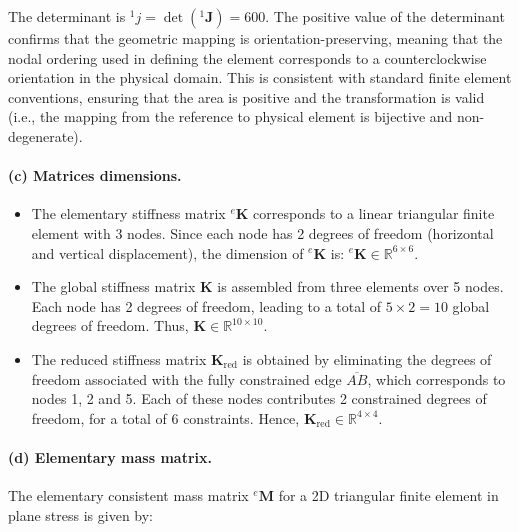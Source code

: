 \documentclass[12pt]{article}
\begin{document}
The determinant is ${}^1{j}=\det({}^1\mathbf{J}) = 600$. The positive value of the determinant confirms that the geometric mapping is orientation-preserving, meaning that the nodal ordering used in defining the element corresponds to a counterclockwise orientation in the physical domain. This is consistent with standard finite element conventions, ensuring that the area is positive and the transformation is valid (i.e., the mapping from the reference to physical element is bijective and non-degenerate).

\paragraph*{(c) Matrices dimensions.}
\begin{itemize}
	\item[(i)] The elementary stiffness matrix ${}^e \mathbf{K}$ corresponds to a linear triangular finite element with 3 nodes. Since each node has 2 degrees of freedom (horizontal and vertical displacement), the dimension of ${}^e \mathbf{K}$ is: ${}^e \mathbf{K} \in \mathbb{R}^{6 \times 6}$.

	\item[(ii)] The global stiffness matrix \( \mathbf{K} \) is assembled from three elements over 5 nodes. Each node has 2 degrees of freedom, leading to a total of \( 5 \times 2 = 10 \) global degrees of freedom. Thus, $\mathbf{K} \in \mathbb{R}^{10 \times 10}$.

	\item[(iii)] The reduced stiffness matrix \( \mathbf{K}_{\text{red}} \) is obtained by eliminating the degrees of freedom associated with the fully constrained edge \( \overline{AB} \), which corresponds to nodes 1, 2 and 5. Each of these nodes contributes 2 constrained degrees of freedom, for a total of 6 constraints. Hence, $\mathbf{K}_{\text{red}} \in \mathbb{R}^{4 \times 4}$.
\end{itemize}



\paragraph*{(d) Elementary mass matrix.} The elementary consistent mass matrix \( {}^e\mathbf{M} \) for a 2D triangular finite element in plane stress is given by:
\end{document}
